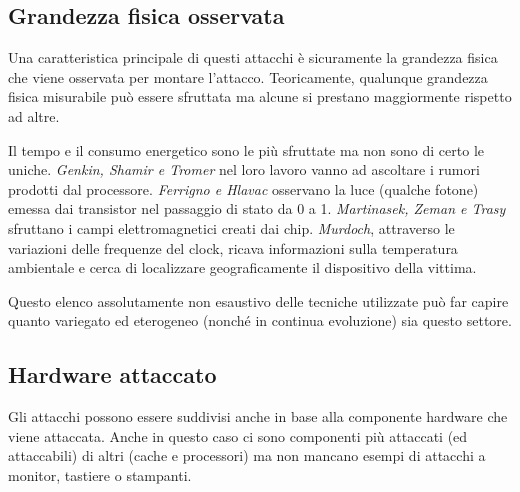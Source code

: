 		\subsection*{Grandezza fisica osservata}		
			Una caratteristica principale di questi attacchi è sicuramente la grandezza fisica che viene osservata per montare l'attacco. Teoricamente, qualunque grandezza fisica misurabile può essere sfruttata ma alcune si prestano maggiormente rispetto ad altre. 
			
			Il tempo e il consumo energetico sono le più sfruttate ma non sono di certo le uniche. \emph{Genkin, Shamir e Tromer} nel loro lavoro \cite{genkin2014rsa} vanno ad ascoltare i rumori prodotti dal processore. \emph{Ferrigno e Hlavac}\cite{ferrigno2008aes} osservano la luce (qualche fotone) emessa dai transistor nel passaggio di stato da 0 a 1. \emph{Martinasek, Zeman e Trasy}\cite{martinasek2012simple} sfruttano i campi elettromagnetici creati dai chip. \emph{Murdoch}, attraverso le variazioni delle frequenze del clock, ricava informazioni sulla temperatura ambientale e cerca di localizzare geograficamente il dispositivo della vittima.
			
			Questo elenco assolutamente non esaustivo delle tecniche utilizzate può far capire quanto variegato ed eterogeneo (nonché in continua evoluzione) sia questo settore.
			
		\subsection*{Hardware attaccato}		
			Gli attacchi possono essere suddivisi anche in base alla componente hardware che viene attaccata. Anche in questo caso ci sono componenti più attaccati (ed attaccabili) di altri (cache e processori) ma non mancano esempi di attacchi a monitor\cite{van1985electromagn}, tastiere\cite{asonov2004keyboard} o stampanti\cite{backes2010acoustic}.
			
